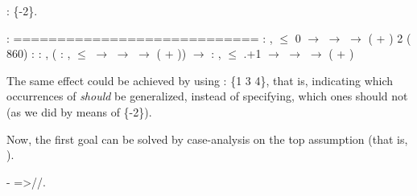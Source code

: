 \begin{coqdoccode}
\coqdocemptyline
\coqdocnoindent
{}:  \{-2\}.\coqdoceol
\coqdocemptyline
\end{coqdoccode}


\coqdoceol
\coqdocemptyline
\coqdocindent{1.00em}
 : \coqdoceol
\coqdocindent{1.00em}
============================\coqdoceol
\coqdocindent{1.50em}
\coqdockw{\ensuremath{\forall}}  : ,  \ensuremath{\le} 0 \ensuremath{\rightarrow}   \ensuremath{\rightarrow}   \ensuremath{\rightarrow}  ( + )\coqdoceol
\coqdocnoindent
\coqdoceol
\coqdocnoindent
{} 2 ( 860) :\coqdoceol
\coqdocindent{0.50em}
\coqdockw{\ensuremath{\forall}}  : ,\coqdoceol
\coqdocindent{0.50em}
(\coqdockw{\ensuremath{\forall}}  : ,  \ensuremath{\le}  \ensuremath{\rightarrow}   \ensuremath{\rightarrow}   \ensuremath{\rightarrow}  ( + )) \ensuremath{\rightarrow}\coqdoceol
\coqdocindent{0.50em}
\coqdockw{\ensuremath{\forall}}  : ,  \ensuremath{\le} .+1 \ensuremath{\rightarrow}   \ensuremath{\rightarrow}   \ensuremath{\rightarrow}  ( + )

\coqdocemptyline


The same effect could be achieved by using :  \{1 3 4\}, that
is, indicating which occurrences of  \textit{should} be generalized,
instead of specifying, which ones should not (as we did by means of
\{-2\}).


Now, the first goal can be solved by case-analysis on the top
assumption (that is, ).


\begin{coqdoccode}
\coqdocemptyline
\coqdocnoindent
-  =>//.\coqdoceol
\coqdocemptyline
\end{coqdoccode}


